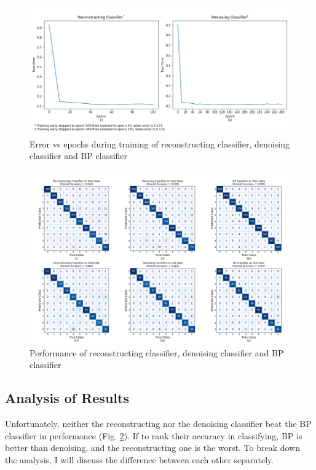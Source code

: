 \documentclass[11pt,titlepage]{article}
\begin{document}
\begin{figure}[H]
	\centering
	\includegraphics[width=\linewidth]{img/h4p2_train}
	\caption{Error vs epochs during training of reconstructing classifier, denoising classifier and BP classifier}
	\label{fig:classifier_train}
\end{figure}

\begin{figure}[H]
	\centering
	\includegraphics[width=\linewidth]{img/h4p2_cm}
	\caption{Performance of reconstructing classifier, denoising classifier and BP classifier}
	\label{fig:classifier_cm}
\end{figure}

\newpage
\subsection{Analysis of Results}
Unfortunately, neither the reconstructing nor the denoising classifier beat the BP classifier in performance (Fig. \ref{fig:classifier_cm}). If to rank their accuracy in classifying, BP is better than denoising, and the  reconstructing one is the worst. To break down the analysis, I will discuss the difference between each other separately. 
\end{document}
